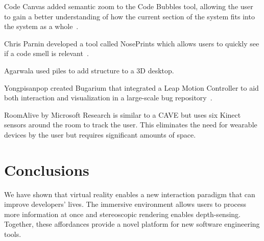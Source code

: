 \documentclass[conference]{IEEEtran}
\begin{document}
Code Canvas added semantic zoom to the Code Bubbles tool, allowing the user to gain a better understanding of how the current section of the system fits into the system as a whole~\cite{DeLine:CodeCanvas}.

Chris Parnin developed a tool called NosePrints which allows users to quickly see if a code smell is relevant~\cite{parnin:Noseprints}.

Agarwala used piles to add structure to a 3D desktop.~\cite{Agarawala:BumpTop}

Yongpisanpop created Bugarium that integrated a Leap Motion Controller to aid both interaction and visualization in a large-scale bug repository~\cite{Bugarium}.

RoomAlive by Microsoft Research is similar to a CAVE but uses six Kinect sensors around the room to track the user.  This eliminates the need for wearable devices by the user but requires significant amounts of space.~\cite{Jones:RoomAlive}

\section{Conclusions}
We have shown that virtual reality enables a new interaction paradigm that can improve developers' lives. 
The immersive environment allows users to process more information at once and stereoscopic rendering enables depth-sensing. 
Together, these affordances provide a novel platform for new software engineering tools.



\end{document}
